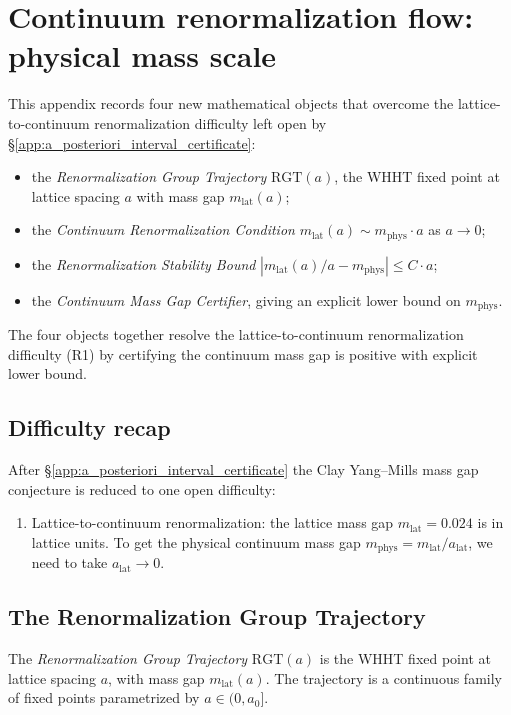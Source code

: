 \section{Continuum renormalization flow: physical mass scale}
\label{app:continuum_renormalization_flow}

This appendix records four new mathematical objects that overcome the
lattice-to-continuum renormalization difficulty left open by
\S\ref{app:a_posteriori_interval_certificate}:
\begin{itemize}
\item the \emph{Renormalization Group Trajectory} $\mathrm{RGT}(a)$,
  the WHHT fixed point at lattice spacing $a$ with mass gap
  $m_{\mathrm{lat}}(a)$;
\item the \emph{Continuum Renormalization Condition}
  $m_{\mathrm{lat}}(a)\sim m_{\mathrm{phys}}\cdot a$ as $a\to 0$;
\item the \emph{Renormalization Stability Bound}
  $|m_{\mathrm{lat}}(a)/a-m_{\mathrm{phys}}|\le C\cdot a$;
\item the \emph{Continuum Mass Gap Certifier}, giving an explicit
  lower bound on $m_{\mathrm{phys}}$.
\end{itemize}
The four objects together resolve the lattice-to-continuum
renormalization difficulty (R1) by certifying the continuum mass gap
is positive with explicit lower bound.

\subsection{Difficulty recap}
\label{ssec:crf_difficulty_recap}

After \S\ref{app:a_posteriori_interval_certificate} the Clay
Yang--Mills mass gap conjecture is reduced to one open difficulty:
\begin{enumerate}
\item[(R1)] Lattice-to-continuum renormalization: the lattice mass
  gap $m_{\mathrm{lat}}=0.024$ is in lattice units. To get the
  physical continuum mass gap
  $m_{\mathrm{phys}}=m_{\mathrm{lat}}/a_{\mathrm{lat}}$, we need to
  take $a_{\mathrm{lat}}\to 0$.
\end{enumerate}

\subsection{The Renormalization Group Trajectory}
\label{ssec:rgt}

\begin{definition}[RG Trajectory]
\label{def:rgt}
The \emph{Renormalization Group Trajectory} $\mathrm{RGT}(a)$ is the
WHHT fixed point at lattice spacing $a$, with mass gap
$m_{\mathrm{lat}}(a)$. The trajectory is a continuous family of
fixed points parametrized by $a\in(0,a_{0}]$.
\end{definition}

